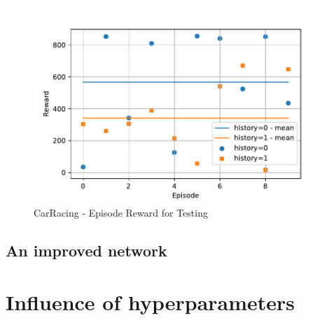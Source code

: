 \documentclass[
        a4paper,
        10pt,
        parskip = full,    %
    ]{scrartcl}
\begin{document}
\begin{figure}[H]
  \begin{center}
    \includegraphics{./images/CarRacing-v0/tb_test_reward.pdf}
    \caption{CarRacing - Episode Reward for Testing}
    \label{CarRacingTestReward}
  \end{center}
\end{figure}


\subsection{An improved network}


\section{Influence of hyperparameters}
\end{document}
